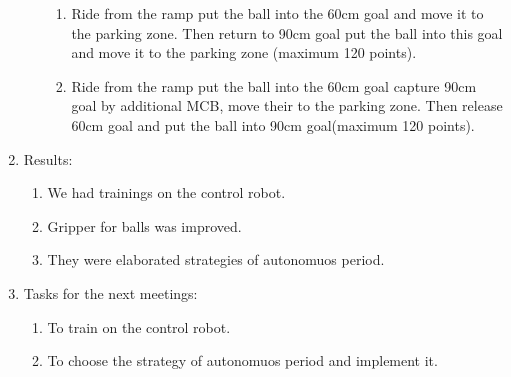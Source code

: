 \begin{enumerate}
\begin{enumerate}
\begin{enumerate}
        	\item Ride from the ramp put the ball into the 60cm goal and move it to the parking zone. Then return to 90cm goal put the ball into this goal and move it to the parking zone (maximum 120 points).
        	
        	\item Ride from the ramp put the ball into the 60cm goal capture 90cm goal by additional MCB, move their to the parking zone. Then release 60cm goal and put the ball into 90cm goal(maximum 120 points).
        	
        \end{enumerate}

	\end{enumerate}
	
	\item  Results:
	\begin{enumerate}
		
		\item We had trainings on the control robot.
		
		\item Gripper for balls was improved.
		
		\item They were elaborated strategies of autonomuos period.
		
	\end{enumerate}
	
	\item Tasks for the next meetings:
	\begin{enumerate}
		
		\item To train on the control robot.
		
		\item To choose the strategy of autonomuos period and implement it.
			
	\end{enumerate}
\end{enumerate}
\fillpage
